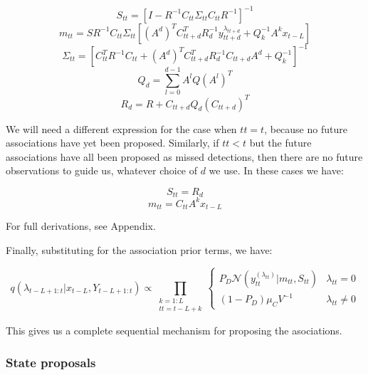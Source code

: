 \begin{equation} S_{tt} = [ I - R^{-1} C_{tt} \Sigma_{tt} C_{tt} R^{-1} ]^{-1} \label{eq:} \end{equation}
\begin{equation} m_{tt} = S R^{-1} C_{tt} \Sigma_{tt} [ (A^d)^T C_{tt+d}^T R_d^{-1} y_{tt+d}^{\lambda_{tt+d}} + Q_k^{-1} A^k x_{t-L} ] \label{eq:} \end{equation}
\begin{equation} \Sigma_{tt} = [ C_{tt}^T R^{-1} C_{tt} + (A^d)^T C_{tt+d}^T R_d^{-1} C_{tt+d} A^d + Q_k^{-1}]^{-1} \label{eq:} \end{equation}
\begin{equation} Q_d = \sum_{l=0}^{d-1} {A^l Q (A^l)^T} \label{eq:} \end{equation}
\begin{equation} R_d = R + C_{tt+d} Q_d (C_{tt+d})^T \label{eq:} \end{equation}

We will need a different expression for the case when $tt=t$, because no future associations have yet been proposed. Similarly, if $tt<t$ but the future associations have all been proposed as missed detections, then there are no future observations to guide us, whatever choice of $d$ we use. In these cases we have:

\begin{equation} S_{tt} = R_d \end{equation}
\begin{equation} m_{tt} = C_{tt} A^k x_{t-L} \label{eq:} \end{equation}

For full derivations, see Appendix.

Finally, substituting for the association prior terms, we have:

\begin{equation}
q(\lambda_{t-L+1:t}|x_{t-L}, Y_{t-L+1:t}) \propto \prod_{\substack{k=1:L\\tt=t-L+k}} \begin{cases}
P_D \mathcal{N}(y_{tt}^{(\lambda_{tt})}|m_{tt}, S_{tt}) & \lambda_{tt}=0 \\
(1-P_D) \mu_C V^{-1} & \lambda_{tt} \ne 0 \end{cases}
\label{eq:}
\end{equation}

This gives us a complete sequential mechanism for proposing the asociations.



\subsubsection{State proposals}

